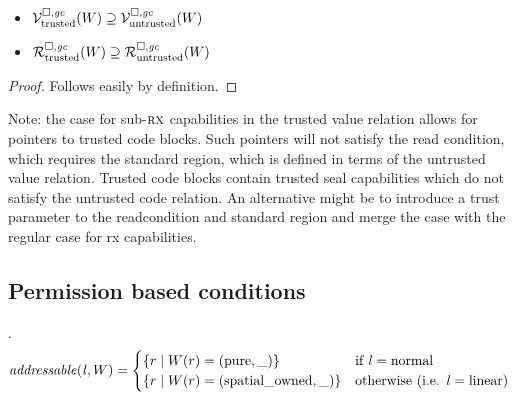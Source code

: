 \documentclass[a4paper]{article}
\begin{document}
\begin{lemma}
  \label{lem:untrusted-supset-trust}
  \begin{itemize}
  \item $\mathcal{V}^{\square,\mathit{gc}}_{\mathrm{trusted}}(W) \supseteq \mathcal{V}^{\square,\mathit{gc}}_{\mathrm{untrusted}}(W)$
  \item $\mathcal{R}^{\square,\mathit{gc}}_{\mathrm{trusted}}(W) \supseteq \mathcal{R}^{\square,\mathit{gc}}_{\mathrm{untrusted}}(W)$
  \end{itemize}
\end{lemma}
\begin{proof}
  Follows easily by definition.
\end{proof}

Note: the case for sub-$\textsc{rx}$ capabilities in the trusted value relation allows for pointers to trusted code blocks.
Such pointers will not satisfy the read condition, which requires the standard region, which is defined in terms of the untrusted value relation.
Trusted code blocks contain trusted seal capabilities which do not satisfy the untrusted code relation.
An alternative might be to introduce a trust parameter to the readcondition and standard region and merge the case with the regular case for rx capabilities.

\subsection{Permission based conditions}
.
\[
  \addressable{\lin,W} =
  \begin{cases}
    \{ r \mid W(r) = (\pure,\_) \} & \text{if $\lin = \normal$} \\
    \{ r \mid W(r) = (\spatialo,\_) \}  & \text{otherwise (i.e. $\lin = \linear$)} \\
  \end{cases}
\]
\end{document}
